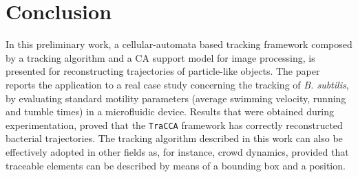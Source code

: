 \section{Conclusion}\label{conclusions}
In this preliminary work, a cellular-automata based tracking framework composed by a tracking algorithm and a CA support model for image processing, is presented for reconstructing trajectories of particle-like objects. The paper reports the application to a real case study concerning the tracking of \textit{B. subtilis}, by evaluating  standard motility parameters (average swimming velocity, running and tumble times) in a microfluidic device. Results that were obtained during experimentation, proved that the \texttt{TraCCA} framework has correctly reconstructed bacterial trajectories. The tracking algorithm described in this work can also be effectively adopted in other fields as, for instance, crowd dynamics, provided that traceable elements can be described by means of a bounding box and a position.
